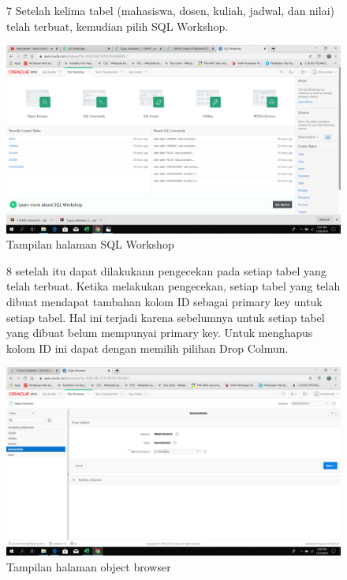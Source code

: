 \begin{enumerate}
\begin{figure}[!htbp]
\item[7]Setelah kelima tabel (mahasiswa, dosen, kuliah, jadwal, dan nilai) telah terbuat, kemudian pilih SQL Workshop.

    \begin{center}
    \includegraphics[scale=0.2]{figures/31.png}
     \caption{Tampilan halaman SQL Workshop}
    \end{center}   
    \end{figure}
    
\begin{figure}[!htbp]
\item[8]setelah itu dapat dilakukann pengecekan pada setiap tabel yang telah terbuat. Ketika melakukan pengecekan, setiap tabel yang telah dibuat mendapat tambahan kolom ID sebagai primary key untuk setiap tabel. Hal ini terjadi karena sebelumnya untuk setiap tabel yang dibuat belum mempunyai primary key. Untuk menghapus kolom ID ini dapat dengan memilih pilihan Drop Colmun.

    \begin{center}
    \includegraphics[scale=0.2]{figures/15.png}
     \caption{Tampilan halaman object browser}
    \end{center}   
    \end{figure}
    

\end{enumerate}
